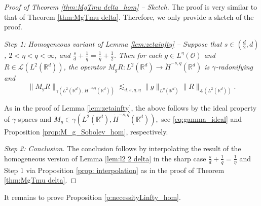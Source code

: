 \documentclass[reqno]{amsart}
\theoremstyle{plain}
\theoremstyle{remark}
\theoremstyle{plain}
\numberwithin{equation}{section}
\newcommand\calL{\mathcal{L}}
\def\R{{\mathbb R}}
\newcommand{\g}{\gamma}
\newcommand{\1}{\one}
\begin{document}
\begin{proof}[Proof of Theorem \ref{thm:MgTmu delta_hom} -- Sketch]
The proof is very similar to that of Theorem \ref{thm:MgTmu delta}. Therefore, we only provide a sketch of the proof.

\emph{Step 1: Homogeneous variant of Lemma \ref{lem:zetainfty} -- Suppose that 
$s\in (\frac{d}{2},d)$, $2<\eta<q<\infty$, and $\frac{s}{d} + \frac{1}{q} = \frac{1}{\eta}+\frac{1}{2}$. 
Then for each $g\in L^{\eta}(\mathcal{O})$ and $R\in \calL(L^2(\R^d))$, the operator $M_g R:L^2(\R^d)\to \dot{H}^{-s,q}(\R^d)$ is $\gamma$-radonifying and}
\begin{equation}
\label{eq:homogeneous_spaces_Mg_R_bounds_step1}
\|M_g R\|_{\gamma(L^2(\R^d),\dot{H}^{-s,q}(\R^d))}\lesssim_{d,s,q,\eta} \|g\|_{L^\eta(\R^d)} 
\|R\|_{\calL(L^2(\R^d))}.
\end{equation}

As in the proof of Lemma \ref{lem:zetainfty}, the above follows by the ideal property of $\g$-spaces and 
$
M_g\in \g(L^2(\R^d),\dot{H}^{-s,q}(\R^d)),
$
see  \eqref{eq:gamma_ideal} and Proposition \ref{prop:M_g_Sobolev_hom}, respectively.

\smallskip

\emph{Step 2: Conclusion}. The conclusion follows by interpolating the result of the homogeneous version of Lemma \ref{lem:l2 2 delta} in the sharp case $\frac{s}{d} + \frac{1}{q} = \frac{1}{\eta}$ and Step 1 via Proposition \ref{prop: interpolation} as in the proof of Theorem \ref{thm:MgTmu delta}.
\end{proof}
 
 
 It remains to prove Proposition  \ref{p:necessityLinfty_hom}.
\end{document}

